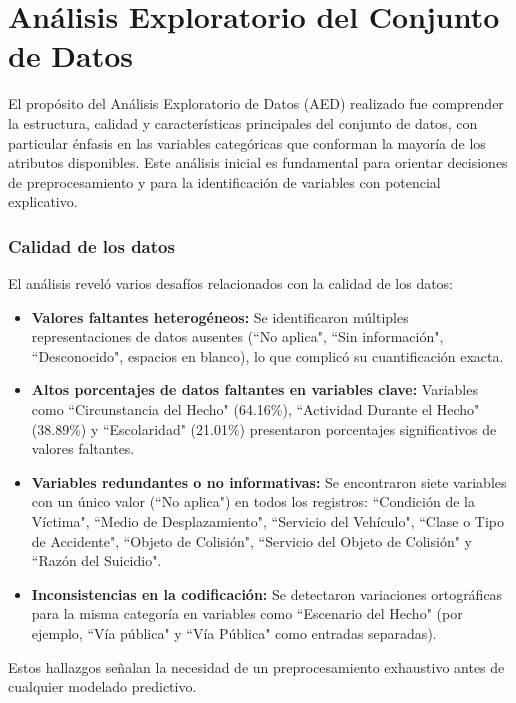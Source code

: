 \documentclass[lettersize,journal]{IEEEtran}
\begin{document}
\section{Análisis Exploratorio del Conjunto de Datos}
El propósito del Análisis Exploratorio de Datos (AED) realizado fue comprender la estructura, calidad y características principales del conjunto de datos, con particular énfasis en las variables categóricas que conforman la mayoría de los atributos disponibles. Este análisis inicial es fundamental para orientar decisiones de preprocesamiento y para la identificación de variables con potencial explicativo.

\subsubsection{Calidad de los datos}
El análisis reveló varios desafíos relacionados con la calidad de los datos:
\begin{itemize}
\item \textbf{Valores faltantes heterogéneos:} Se identificaron múltiples representaciones de datos ausentes (``No aplica", ``Sin información", ``Desconocido", espacios en blanco), lo que complicó su cuantificación exacta.
\item \textbf{Altos porcentajes de datos faltantes en variables clave:} Variables como ``Circunstancia del Hecho" (64.16\%), ``Actividad Durante el Hecho" (38.89\%) y ``Escolaridad" (21.01\%) presentaron porcentajes significativos de valores faltantes.
\item \textbf{Variables redundantes o no informativas:} Se encontraron siete variables con un único valor (``No aplica") en todos los registros: ``Condición de la Víctima", ``Medio de Desplazamiento", ``Servicio del Vehículo", ``Clase o Tipo de Accidente", ``Objeto de Colisión", ``Servicio del Objeto de Colisión" y ``Razón del Suicidio".
\item \textbf{Inconsistencias en la codificación:} Se detectaron variaciones ortográficas para la misma categoría en variables como ``Escenario del Hecho" (por ejemplo, ``Vía pública" y ``Vía Pública" como entradas separadas).
\end{itemize}
Estos hallazgos señalan la necesidad de un preprocesamiento exhaustivo antes de cualquier modelado predictivo.
\end{document}

